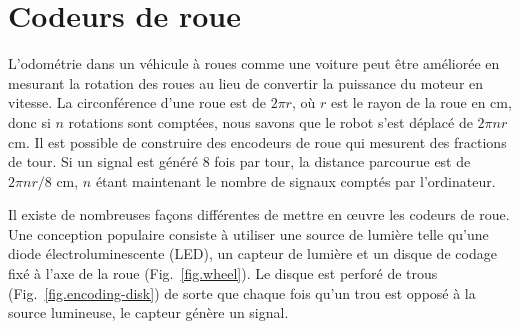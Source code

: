{\section{Codeurs de roue}\label{s.wheel}

L'odométrie dans un véhicule à roues comme une voiture peut être améliorée en mesurant la rotation des roues au lieu de convertir la puissance du moteur en vitesse. La circonférence d'une roue est de $2\pi r$, où $r$ est le rayon de la roue en cm, donc si $n$ rotations sont comptées, nous savons que le robot s'est déplacé de $2\pi n r$ cm. Il est possible de construire des encodeurs de roue qui mesurent des fractions de tour. Si un signal est généré $8$ fois par tour, la distance parcourue est de $2\pi nr /8$ cm, $n$ étant maintenant le nombre de signaux comptés par l'ordinateur.

Il existe de nombreuses façons différentes de mettre en œuvre les codeurs de roue. Une conception populaire consiste à utiliser une source de lumière telle qu'une diode électroluminescente (LED), un capteur de lumière et un disque de codage fixé à l'axe de la roue (Fig.~\ref{fig.wheel}). Le disque est perforé de trous (Fig.~\ref{fig.encoding-disk}) de sorte que chaque fois qu'un trou est opposé à la source lumineuse, le capteur génère un signal.

}
